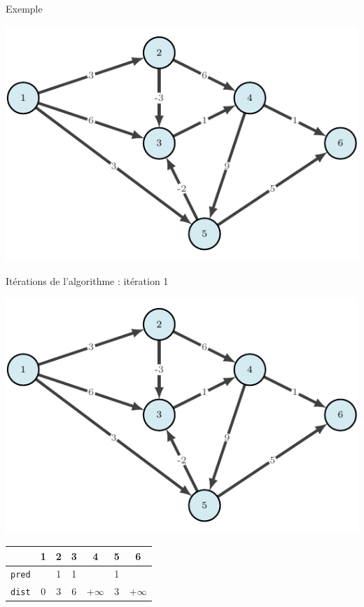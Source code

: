 \begin{frame}{Exemple}
    \begin{center}
        \includegraphics[height=.6\textheight]{fig/bellman-0.pdf}

    \end{center}
\end{frame}

\begin{frame}{Itérations de l'algorithme : itération 1}
    \begin{center}
        \includegraphics[height=.6\textheight]{fig/bellman-0.pdf}      
    \begin{tabular}{c|cccccc}
      
        & 1    &2      &3      &4      &5      &6      \\
        \hline
        \texttt{pred} & &1      &1      &       &1      &       \\
        \texttt{dist} & 0       &3      &6      &$+\infty$    &3      &$+\infty$    \\

    \end{tabular}
\end{center}
\end{frame}

